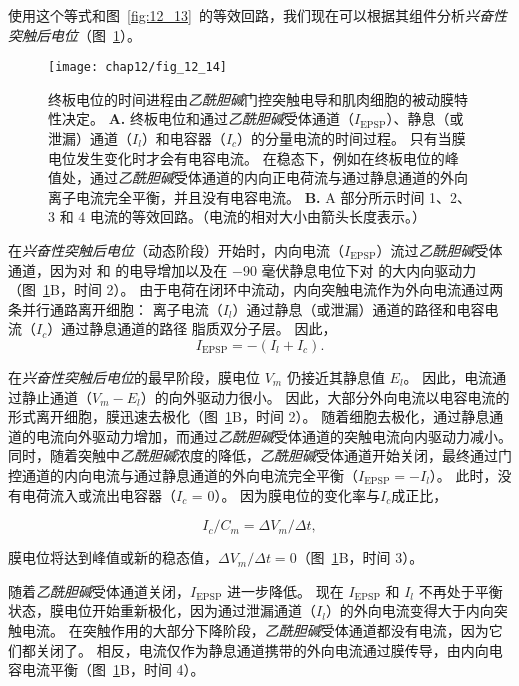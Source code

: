 使用这个等式和图~\ref{fig:12_13}~的等效回路，我们现在可以根据其组件分析\textit{兴奋性突触后电位}（图~\ref{fig:12_14}）。


\begin{figure}[htbp]
	\centering
	\texttt{[image: chap12/fig\_12\_14]}
	\caption{终板电位的时间进程由\textit{乙酰胆碱}门控突触电导和肌肉细胞的被动膜特性决定。
		\textbf{A.} 终板电位和通过\textit{乙酰胆碱}受体通道（$I_{\text{EPSP}}$）、静息（或泄漏）通道（$ I_l $）和电容器（$ I_c $）的分量电流的时间过程。
		只有当膜电位发生变化时才会有电容电流。
		在稳态下，例如在终板电位的峰值处，通过\textit{乙酰胆碱}受体通道的内向正电荷流与通过静息通道的外向离子电流完全平衡，并且没有电容电流。
		\textbf{B.} A 部分所示时间 1、2、3 和 4 电流的等效回路。（电流的相对大小由箭头长度表示。）}
	\label{fig:12_14}
\end{figure}


在\textit{兴奋性突触后电位}（动态阶段）开始时，内向电流（$I_{\text{EPSP}}$）流过\textit{乙酰胆碱}受体通道，因为对  和  的电导增加以及在 −90 毫伏静息电位下对  的大内向驱动力 （图~\ref{fig:12_14}B，时间 2）。
由于电荷在闭环中流动，内向突触电流作为外向电流通过两条并行通路离开细胞：
离子电流（$ I_l $）通过静息（或泄漏）通道的路径和电容电流（$ I_c $）通过静息通道的路径 脂质双分子层。
因此，
\begin{equation}\label{ionic_current}
	I_{\text{EPSP}} = -(I_l + I_c).
\end{equation}

在\textit{兴奋性突触后电位}的最早阶段，膜电位 $V_m$ 仍接近其静息值 $ E_l $。
因此，电流通过静止通道（$V_m - E_l$）的向外驱动力很小。
因此，大部分外向电流以电容电流的形式离开细胞，膜迅速去极化（图~\ref{fig:12_14}B，时间 2）。 
随着细胞去极化，通过静息通道的电流向外驱动力增加，而通过\textit{乙酰胆碱}受体通道的突触电流向内驱动力减小。
同时，随着突触中\textit{乙酰胆碱}浓度的降低，\textit{乙酰胆碱}受体通道开始关闭，最终通过门控通道的内向电流与通过静息通道的外向电流完全平衡（$I_{\text{EPSP}} = - I_l$）。
此时，没有电荷流入或流出电容器（$ I_c $ = 0）。
因为膜电位的变化率与$ I_c $成正比，


\begin{equation}\label{rate_potential}
	I_c / C_m = \Delta V_m / \Delta t,
\end{equation}

膜电位将达到峰值或新的稳态值，$\Delta V_m / \Delta t = 0 $（图~\ref{fig:12_14}B，时间 3）。


随着\textit{乙酰胆碱}受体通道关闭，$I_{\text{EPSP}}$ 进一步降低。
现在 $I_{\text{EPSP}}$ 和 $ I_l $ 不再处于平衡状态，膜电位开始重新极化，因为通过泄漏通道（$ I_l $）的外向电流变得大于内向突触电流。
在突触作用的大部分下降阶段，\textit{乙酰胆碱}受体通道都没有电流，因为它们都关闭了。
相反，电流仅作为静息通道携带的外向电流通过膜传导，由内向电容电流平衡（图~\ref{fig:12_14}B，时间 4）。


